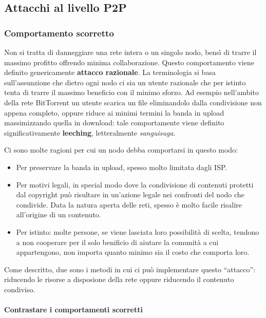 \subsection{Attacchi al livello P2P}\label{attacchi-al-livello-p2p}

\subsubsection{Comportamento scorretto}\label{comportamento-scorretto}
 Non si tratta di danneggiare una rete intera o un singolo nodo, bensì di trarre il massimo profitto offrendo minima collaborazione. Questo comportamento viene definito genericamente \textbf{attacco razionale}. La terminologia si basa sull'assunzione che dietro ogni nodo ci sia un utente razionale che per istinto tenta di trarre il massimo beneficio con il minimo sforzo. Ad esempio nell'ambito della rete BitTorrent un utente scarica un file eliminandolo dalla condivisione non appena completo, oppure riduce ai minimi termini la banda in upload massimizzando quella in download: tale comportamente viene definito significativamente \textbf{leeching}, letteralmente \emph{sanguisuga}.

Ci sono molte ragioni per cui un nodo debba comportarsi in questo modo:

\begin{itemize}
\itemsep1pt\parskip0pt
\item
  Per preservare la banda in upload, spesso molto limitata dagli ISP.
\item
  Per motivi legali, in special modo dove la condivisione di contenuti   protetti dal copyright può risultare in un'azione legale nei confronti   del nodo che condivide. Data la natura aperta delle reti, spesso è   molto facile risalire all'origine di un contenuto.
\item
  Per istinto: molte persone, se viene lasciata loro possibilità di   scelta, tendono a non cooperare per il solo benificio di aiutare la   comunità a cui appartengono, non importa quanto minimo sia il costo   che comporta loro.
\end{itemize}

Come descritto, due sono i metodi in cui ci può implementare questo ``attacco'': riducendo le risorse a disposione della rete oppure riducendo il contenuto condiviso.

\paragraph{Contrastare i comportamenti scorretti}\label{contrastare-i-comportamenti-scorretti}

